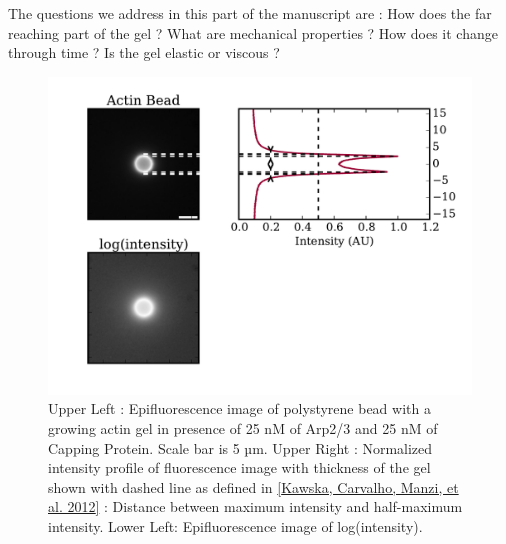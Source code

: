 \documentclass[A4paperpaper,11pt,english]{sphinxmanual}
\begin{document}
The questions we address in this part of the manuscript are :  How does the far
reaching part of the gel ? What are mechanical properties ?  How does it change
through time ?  Is the gel elastic or viscous ?
\begin{figure}[htbp]
\centering
\capstart

\includegraphics[width=1.000\linewidth]{intensity_profile_25nM_Arp_20nM_CP_09min.pdf}
\caption{Upper Left : Epifluorescence image of polystyrene bead with a growing actin
gel in presence of 25 nM of Arp2/3 and 25 nM of Capping Protein. Scale bar
is 5 µm.  Upper Right : Normalized intensity profile of fluorescence image
with thickness of the gel shown with dashed line as defined in
{\hyperref[parts/part3:kawska2012]{{[}Kawska, Carvalho, Manzi,  et al.  2012{]}}} : Distance between maximum intensity and half-maximum
intensity.  Lower Left: Epifluorescence image of log(intensity).}\end{figure}
\end{document}
